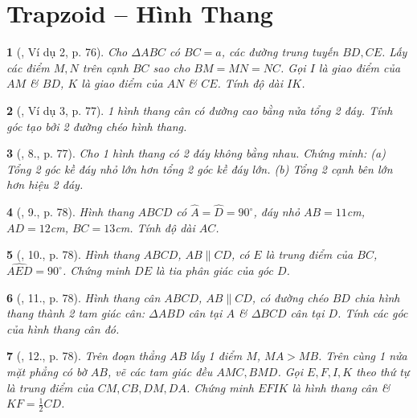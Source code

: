 \documentclass{article}
\newtheorem{baitoan}{}
\begin{document}
\section{Trapzoid -- Hình Thang}

\begin{baitoan}[\cite{Binh_Toan_8_tap_1}, Ví dụ 2, p. 76]
	Cho $\Delta ABC$ có $BC = a$, các đường trung tuyến $BD,CE$. Lấy các điểm $M,N$ trên cạnh $BC$ sao cho $BM = MN = NC$. Gọi $I$ là giao điểm của $AM$ \& $BD$, $K$ là giao điểm của $AN$ \& $CE$. Tính độ dài $IK$.
\end{baitoan}

\begin{baitoan}[\cite{Binh_Toan_8_tap_1}, Ví dụ 3, p. 77]
	1 hình thang cân có đường cao bằng nửa tổng 2 đáy. Tính góc tạo bởi 2 đường chéo hình thang.
\end{baitoan}

\begin{baitoan}[\cite{Binh_Toan_8_tap_1}, 8., p. 77]
	Cho 1 hình thang có 2 đáy không bằng nhau. Chứng minh: (a) Tổng 2 góc kề đáy nhỏ lớn hơn tổng 2 góc kề đáy lớn. (b) Tổng 2 cạnh bên lớn hơn hiệu 2 đáy.
\end{baitoan}

\begin{baitoan}[\cite{Binh_Toan_8_tap_1}, 9., p. 78]
	Hình thang $ABCD$ có $\widehat{A} = \widehat{D} = 90^\circ$, đáy nhỏ $AB = 11${\rm cm}, $AD = 12${\rm cm}, $BC = 13${\rm cm}. Tính độ dài $AC$.
\end{baitoan}

\begin{baitoan}[\cite{Binh_Toan_8_tap_1}, 10., p. 78]
	Hình thang $ABCD$, $AB\parallel CD$, có $E$ là trung điểm của $BC$, $\widehat{AED} = 90^\circ$. Chứng minh $DE$ là tia phân giác của góc $D$.
\end{baitoan}

\begin{baitoan}[\cite{Binh_Toan_8_tap_1}, 11., p. 78]
	Hình thang cân $ABCD$, $AB\parallel CD$, có đường chéo $BD$ chia hình thang thành 2 tam giác cân: $\Delta ABD$ cân tại $A$ \& $\Delta BCD$ cân tại $D$. Tính các góc của hình thang cân đó.
\end{baitoan}

\begin{baitoan}[\cite{Binh_Toan_8_tap_1}, 12., p. 78]
	Trên đoạn thẳng $AB$ lấy 1 điểm $M$, $MA > MB$. Trên cùng 1 nửa mặt phẳng có bờ $AB$, vẽ các tam giác đều $AMC,BMD$. Gọi $E,F,I,K$ theo thứ tự là trung điểm của $CM,CB,DM,DA$. Chứng minh $EFIK$ là hình thang cân \& $KF = \frac{1}{2}CD$.
\end{baitoan}
\end{document}
